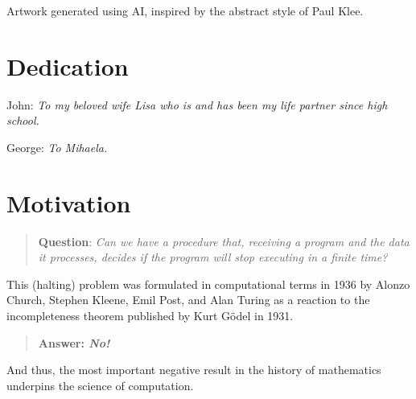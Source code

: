 \documentclass[11pt]{book}
\begin{document}
Artwork generated using AI, inspired by the abstract style of Paul Klee.


\sloppy

\chapter*{Dedication}

\vspace{\baselineskip}\par \noindent
John: {\it To my beloved wife Lisa who is and has been my life partner since high school.}

\vspace{\baselineskip}\par \noindent
George: {\it To Mihaela.}


\chapter*{Motivation}

\vspace{\baselineskip}\par \noindent
\begin{quote}
{\bf Question}: {\em Can we have a procedure that, receiving a program and the data it processes, decides if the program will stop executing in a finite time?}
\end{quote}

\vspace{\baselineskip}\par \noindent
This (halting) problem was formulated in computational terms in 1936 by Alonzo Church, Stephen Kleene, Emil Post, and Alan Turing as a reaction to the incompleteness theorem published by Kurt G\" odel in 1931. 

\begin{quote}
{\bf Answer: {\em No!}}
\end{quote}

\vspace{\baselineskip}\par \noindent
And thus, the most important negative result in the history of mathematics underpins the science of computation.
\end{document}
